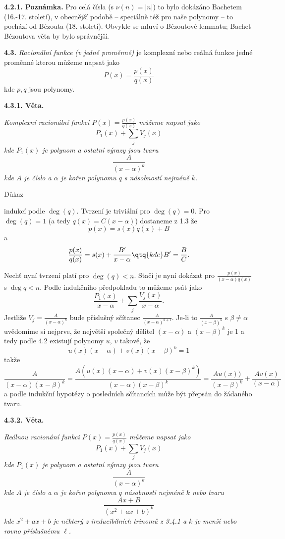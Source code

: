 \documentclass[12pt]{article}
\begin{document}
{ \medskip
 
 {\bf 4.2.1. Poznámka.} Pro celá čísla (s $\nu(n)=|n|$) to bylo dokázáno Bachetem (16.-17. století), v obecnější podobě -- speciálně též pro naše polynomy -- to pochází od B\'ezouta (18. století). Obvykle se mluví o B\'ezoutově lemmatu; 
 Bachet-B\'ezoutova věta by bylo správnější.
 
 
 \bigskip
 
 {\bf 4.3.}  {\em Racionální funkce (v jedné proměnné)} je komplexní nebo reálná funkce jedné proměnné kterou můžeme napsat jako
 $$
 P(x)=\frac{p(x)}{q(x)} 
 $$
 kde $p,q$ jsou polynomy.
 
 \medskip
 
 
  {\bf 4.3.1. Věta.} {\em  Komplexní racionální funkci $P(x)=\frac{p(x)}{q(x)}$ můžeme napsat jako
  $$ 
    P_1(x) + \sum_jV_j(x)
   $$
   kde $P_1(x)$ je polynom a ostatní výrazy jsou tvaru
   $$
   \frac{A}{(x-\alpha)^k}
   $$
   kde $A$ je číslo a $\alpha$ je kořen polynomu $q$ s násobností nejméně $k$.
   
   Důkaz} indukcí podle $\deg (q)$. Tvrzení je triviální pro $\deg (q)=0$. Pro $\deg(q)=1$ (a tedy $q(x)=C(x-\alpha)$) dostaneme z 1.3 že
     $$
   p(x)=s(x)q(x)+B
   $$
   a 
   $$
   \frac{p(x)}{q(x)}=s(x)+\frac{B'}{x-\alpha}\qtq{kde} B'=\frac{B}{C}.
   $$
   
   Nechť nyní tvrzení platí pro $\deg (q)<n$. Stačí je nyní dokázat pro $\frac{p(x)}{(x-\alpha)q(x)}$ s $\deg q<n$.
  Podle indukčního předpokladu to můžeme psát jako
    $$
   \frac{P_1(x)}{x-\alpha} + \sum_j\frac{V_j(x)}{x-\alpha}.
   $$
   Jestliže $V_j=\frac{A}{(x-\alpha)^k}$ bude příslušný sčítanec $\frac{A}{(x-\alpha)^{k+1}}$. Je-li to 
   $\frac{A}{(x-\beta)^k}$ s $\beta\neq\alpha$ uvědomíme si nejprve, že největší společný dělitel $(x-\alpha)$ a 
   $(x-\beta)^k$ je 1 a tedy podle 4.2 existují polynomy $u$, $v$ takové, že
   $$
   u(x)(x-\alpha) +v(x)(x-\beta)^k=1
   $$
   takže
   $$
   \frac{A}{(x-\alpha)(x-\beta)^k} = \frac{A(u(x)(x-\alpha) +v(x)(x-\beta)^k)}{(x-\alpha)(x-\beta)^k}=
  \frac{Au(x))}{(x-\beta)^k}+\frac{Av(x)}{(x-\alpha)}
   $$
   a podle indukční hypotézy o posledních sčítancích může být přepsán do žádaného tvaru. \sq
   
   \bigskip
   
   
  {\bf 4.3.2. Věta.} {\em  Reálnou racionání funkci  $P(x)=\frac{p(x)}{q(x)}$ můžeme napsat jako
  $$
    P_1(x) + \sum_jV_j(x)
   $$
   kde $P_1(x)$ je polynom a ostatní výrazy jsou tvaru
     $$
   \frac{A}{(x-\alpha)^k}
   $$
   kde $A$ je číslo a $\alpha$ je kořen polynomu $q$ násobnosti nejméně $k$
   nebo tvaru
   $$
   \frac{Ax+B}{(x^2+ax+b)^k}
   $$
   kde $x^2+ax+b$ je některý z ireducibilních trinomů z 3.4.1 a $k$ je menší nebo rovno příslušnému  $\ell$.
   
}}
\end{document}
